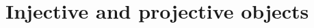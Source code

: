 \documentclass[../../../main]{subfiles}
\begin{document}
\chapter{Injective and projective objects}




\end{document}
